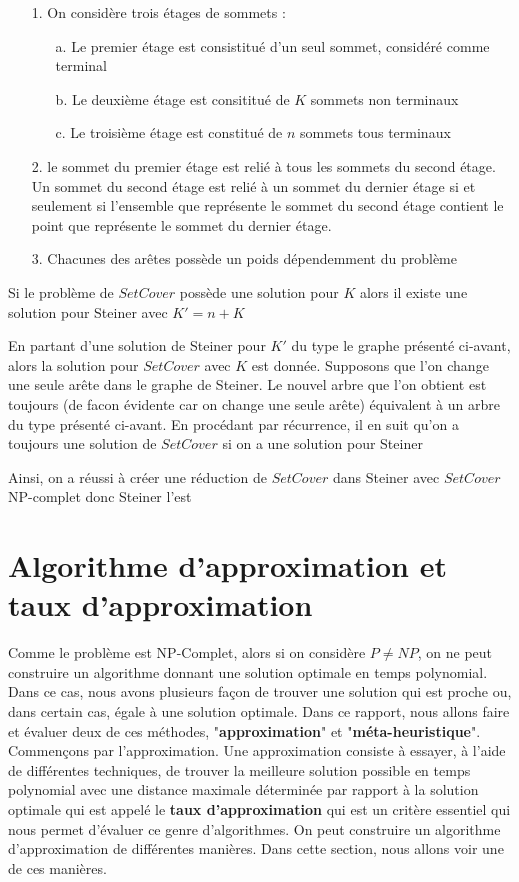\documentclass[11pt,french]{report}
\begin{document}
        \begin{itemize}
	\item[1.] On considère trois étages de sommets :
          \begin{itemize}
          \item[a.] Le premier étage est consistitué d'un seul sommet, considéré comme terminal
          \item[b.] Le deuxième étage est consititué de $K$ sommets non terminaux
          \item[c.] Le troisième étage est constitué de $n$ sommets tous terminaux
          \end{itemize}
        \item[2.] le sommet du premier étage est relié à tous les sommets du second étage. Un sommet du second étage est relié à un sommet du dernier étage si et seulement si l'ensemble que représente le sommet du second étage contient le point que représente le sommet du dernier étage.
          \item[3.] Chacunes des arêtes possède un poids dépendemment du problème
	\end{itemize}

        Si le problème de $Set Cover$ possède une solution pour $K$ alors il existe une solution pour Steiner avec $K' = n+K$

        En partant d'une solution de Steiner pour $K'$ du type le graphe présenté ci-avant, alors la solution pour $Set Cover$ avec $K$ est donnée.
        Supposons que l'on change une seule arête dans le graphe de Steiner. Le nouvel arbre que l'on obtient est toujours (de facon évidente car on change une seule arête) équivalent à un arbre du type présenté ci-avant. En procédant par récurrence, il en suit qu'on a toujours une solution de $Set Cover$ si on a une solution pour Steiner


        Ainsi, on a réussi à créer une réduction de $Set Cover$ dans Steiner avec $Set Cover$ NP-complet donc Steiner l'est
        
	\section{Algorithme d'approximation et taux d'approximation\label{Approx}}
	Comme le problème est NP-Complet, alors si on considère $P\neq NP$, on ne peut construire un algorithme donnant une solution optimale en temps polynomial. Dans ce cas, nous avons plusieurs façon de trouver une solution qui est proche ou, dans certain cas, égale à une solution optimale. Dans ce rapport, nous allons faire et évaluer deux de ces méthodes, "\textbf{approximation}" et "\textbf{méta-heuristique}". Commençons par l'approximation. Une approximation consiste à essayer, à l'aide de différentes techniques, de trouver la meilleure solution possible en temps polynomial avec une distance maximale déterminée par rapport à la solution optimale qui est appelé le \textbf{taux d'approximation} qui est un critère essentiel qui nous permet d'évaluer ce genre d'algorithmes. On peut construire un algorithme d'approximation de différentes manières. Dans cette section, nous allons voir une de ces manières.
	
\end{document}
